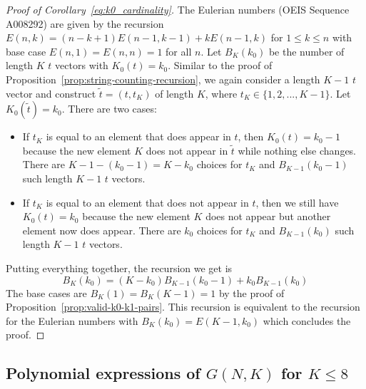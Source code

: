 \documentclass{article}
\begin{document}
\begin{proof}[Proof of Corollary~\ref{eq:k0_cardinality}]
The Eulerian numbers (OEIS Sequence A008292) are given by the recursion $E(n,k)=(n-k+1) E(n-1,k-1)+k E(n-1,k)$ for $1\leq k \leq n$ with base case $E(n,1)=E(n,n) = 1$ for all $n$. Let $B_K(k_0)$ be the number of length $K$ $t$ vectors with $K_0(t)=k_0$. Similar to the proof of Proposition~\ref{prop:string-counting-recursion}, we again consider a length $K-1$ $t$ vector and construct $\tilde{t} = (t, t_K)$ of length $K$, where $t_K \in \{1,2,...,K-1\}$. Let $K_0(\tilde{t}) = k_0$. There are two cases: 
\begin{itemize}
    \item If $t_K$ is equal to an element that does appear in $t$, then $K_0(t) = k_0 -1$ because the new element $K$ does not appear in $\tilde{t}$ while nothing else changes. There are $K-1-(k_0-1)=K-k_0$ choices for $t_K$ and $B_{K-1}(k_0-1)$ such length $K-1$ $t$ vectors. 
    \item If $t_K$ is equal to an element that does not appear in $t$, then we still have $K_0(t)= k_0$ because the new element $K$ does not appear but another element now does appear. There are $k_0$ choices for $t_K$ and $B_{K-1}(k_0)$ such length $K-1$ $t$ vectors.
\end{itemize}
Putting everything together, the recursion we get is \[ B_K(k_0) = (K-k_0) B_{K-1}(k_0-1) + k_0 B_{K-1}(k_0)\] The base cases are $B_K(1)= B_K(K-1)= 1$ by the proof of Proposition~\ref{prop:valid-k0-k1-pairs}. This recursion is equivalent to the recursion for the Eulerian numbers with $B_K(k_0)= E(K-1, k_0)$ which concludes the proof.  
\end{proof}

\subsection{Polynomial expressions of $G(N,K)$ for $K\leq 8$} \label{subsec:polynomial_GNK}
\end{document}
